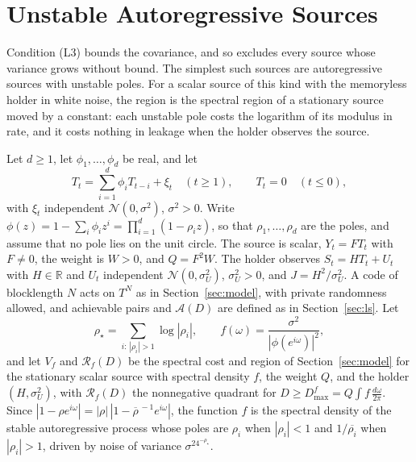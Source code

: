 \documentclass[11pt,onecolumn]{IEEEtran}
\newcommand{\R}{\mathbb{R}}
\newcommand{\dw}{\tfrac{d\omega}{2\pi}}
\begin{document}
\section{Unstable Autoregressive Sources}
\label{sec:unstable}

Condition (L3) bounds the covariance, and so excludes every source whose
variance grows without bound. The simplest such sources are
autoregressive sources with unstable poles. For a scalar source of this
kind with the memoryless holder in white noise, the region is the
spectral region of a stationary source moved by a constant: each
unstable pole costs the logarithm of its modulus in rate, and it costs
nothing in leakage when the holder observes the source.

Let $d\ge1$, let $\phi_1,\dots,\phi_d$ be real, and let
\[
T_t=\sum_{i=1}^d\phi_iT_{t-i}+\xi_t\quad(t\ge1),\qquad T_t=0\quad(t\le0),
\]
with $\xi_t$ independent $\mathcal N(0,\sigma^2)$, $\sigma^2>0$. Write
$\phi(z)=1-\sum_i\phi_iz^i=\prod_{i=1}^d(1-\rho_iz)$, so that
$\rho_1,\dots,\rho_d$ are the poles, and assume that no pole lies on the
unit circle. The source is scalar, $Y_t=FT_t$ with $F\ne0$, the weight
is $W>0$, and $Q=F^2W$. The holder observes $S_t=HT_t+U_t$ with $H\in\R$
and $U_t$ independent $\mathcal N(0,\sigma_U^2)$, $\sigma_U^2>0$, and
$J=H^2/\sigma_U^2$. A code of blocklength $N$ acts on $T^N$ as in
Section~\ref{sec:model}, with private randomness allowed, and
achievable pairs and $\mathcal A(D)$ are defined as in
Section~\ref{sec:ls}. Let
\[
\rho_\star=\sum_{i:\,|\rho_i|>1}\log|\rho_i|,\qquad
f(\omega)=\frac{\sigma^2}{|\phi(e^{i\omega})|^2},
\]
and let $V_f$ and $\mathcal R_f(D)$ be the spectral cost and region of
Section~\ref{sec:model} for the stationary scalar source with spectral
density $f$, the weight $Q$, and the holder $(H,\sigma_U^2)$, with
$\mathcal R_f(D)$ the nonnegative quadrant for
$D\ge D_{\max}^f=Q\int f\,\dw$. Since
$|1-\rho e^{i\omega}|=|\rho|\,|1-\overline{\rho}^{\,-1}e^{i\omega}|$, the
function $f$ is the spectral density of the stable autoregressive process
whose poles are $\rho_i$ when $|\rho_i|<1$ and $1/\overline{\rho_i}$ when
$|\rho_i|>1$, driven by noise of variance $\sigma^24^{-\rho_\star}$.
\end{document}

